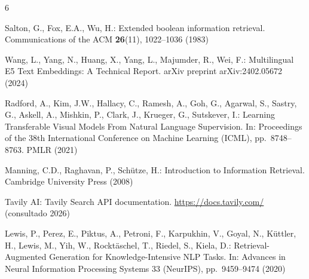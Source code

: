 \documentclass[runningheads,a4paper]{llncs}
\begin{document}
\begin{thebibliography}{6}

Salton, G., Fox, E.A., Wu, H.: Extended boolean information retrieval. Communications of the ACM \textbf{26}(11), 1022--1036 (1983)

Wang, L., Yang, N., Huang, X., Yang, L., Majumder, R., Wei, F.: Multilingual E5 Text Embeddings: A Technical Report. arXiv preprint arXiv:2402.05672 (2024)

Radford, A., Kim, J.W., Hallacy, C., Ramesh, A., Goh, G., Agarwal, S., Sastry, G., Askell, A., Mishkin, P., Clark, J., Krueger, G., Sutskever, I.: Learning Transferable Visual Models From Natural Language Supervision. In: Proceedings of the 38th International Conference on Machine Learning (ICML), pp.\ 8748--8763. PMLR (2021)

Manning, C.D., Raghavan, P., Sch\"utze, H.: Introduction to Information Retrieval. Cambridge University Press (2008)

Tavily AI: Tavily Search API documentation. \url{https://docs.tavily.com/} (consultado 2026)

Lewis, P., Perez, E., Piktus, A., Petroni, F., Karpukhin, V., Goyal, N., K\"uttler, H., Lewis, M., Yih, W., Rockt\"aschel, T., Riedel, S., Kiela, D.: Retrieval-Augmented Generation for Knowledge-Intensive NLP Tasks. In: Advances in Neural Information Processing Systems 33 (NeurIPS), pp.\ 9459--9474 (2020)

\end{thebibliography}
\end{document}

